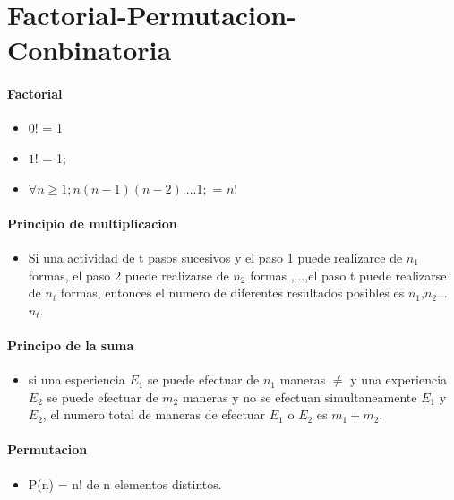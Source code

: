 \documentclass[a4paper]{article}
\begin{document}
\section{Factorial-Permutacion-Conbinatoria}

\paragraph{Factorial}
	\begin{itemize}
		\item $0!$ = 1		 
		\item $1!$ = 1;
		\item  $\forall n \geq 1; n(n-1)(n-2)....1;$ = $n!$ 
	\end{itemize}

\paragraph{Principio de multiplicacion}

\begin{itemize}
\item Si una actividad de t pasos sucesivos y el paso 1 puede realizarce de $n_1$ formas, el paso 2 puede realizarse de $n_2$ formas ,...,el paso t puede realizarse de $n_t$ formas,	entonces el numero de diferentes resultados posibles es	$n_1$,$n_2$...$n_t$.
\end{itemize}

\paragraph{Principo de la suma}
\begin{itemize}
	\item si una esperiencia $E_1$  se puede efectuar de $n_1$ maneras $\neq$ y una experiencia $E_2$ se puede efectuar de $m_2$ maneras y no se efectuan simultaneamente $E_1$ y $E_2$, el numero total de maneras de efectuar  $E_1$ o $E_2$ es $m_1 + m_2$.
\end{itemize}

\paragraph{Permutacion}
\begin{itemize}
	\item P(n) = n! de n elementos distintos.
\end{itemize}
\end{document}
